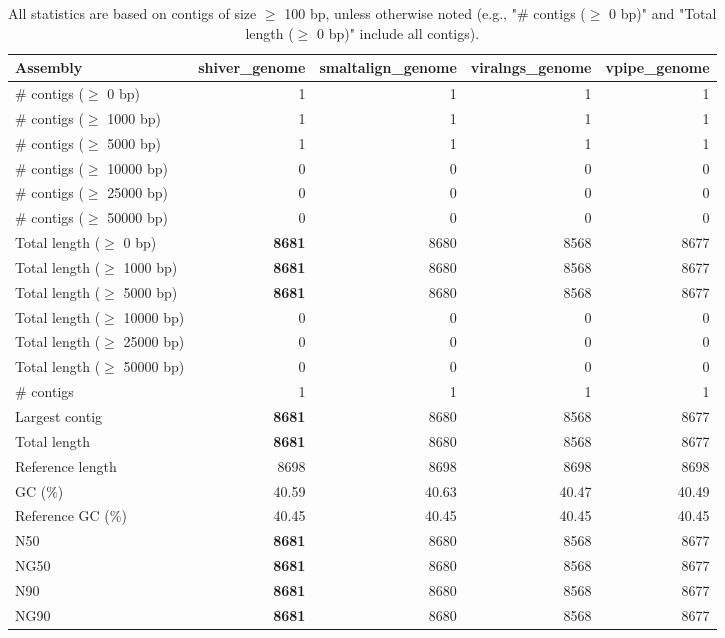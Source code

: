 \documentclass[12pt,a4paper]{article}
\begin{document}
\begin{table}[ht]
\begin{center}
\caption{All statistics are based on contigs of size $\geq$ 100 bp, unless otherwise noted (e.g., "\# contigs ($\geq$ 0 bp)" and "Total length ($\geq$ 0 bp)" include all contigs).}
\begin{tabular}{|l*{4}{|r}|}
\hline
Assembly & shiver\_genome & smaltalign\_genome & viralngs\_genome & vpipe\_genome \\ \hline
\# contigs ($\geq$ 0 bp) & 1 & 1 & 1 & 1 \\ \hline
\# contigs ($\geq$ 1000 bp) & 1 & 1 & 1 & 1 \\ \hline
\# contigs ($\geq$ 5000 bp) & 1 & 1 & 1 & 1 \\ \hline
\# contigs ($\geq$ 10000 bp) & 0 & 0 & 0 & 0 \\ \hline
\# contigs ($\geq$ 25000 bp) & 0 & 0 & 0 & 0 \\ \hline
\# contigs ($\geq$ 50000 bp) & 0 & 0 & 0 & 0 \\ \hline
Total length ($\geq$ 0 bp) & {\bf 8681} & 8680 & 8568 & 8677 \\ \hline
Total length ($\geq$ 1000 bp) & {\bf 8681} & 8680 & 8568 & 8677 \\ \hline
Total length ($\geq$ 5000 bp) & {\bf 8681} & 8680 & 8568 & 8677 \\ \hline
Total length ($\geq$ 10000 bp) & 0 & 0 & 0 & 0 \\ \hline
Total length ($\geq$ 25000 bp) & 0 & 0 & 0 & 0 \\ \hline
Total length ($\geq$ 50000 bp) & 0 & 0 & 0 & 0 \\ \hline
\# contigs & 1 & 1 & 1 & 1 \\ \hline
Largest contig & {\bf 8681} & 8680 & 8568 & 8677 \\ \hline
Total length & {\bf 8681} & 8680 & 8568 & 8677 \\ \hline
Reference length & 8698 & 8698 & 8698 & 8698 \\ \hline
GC (\%) & 40.59 & 40.63 & 40.47 & 40.49 \\ \hline
Reference GC (\%) & 40.45 & 40.45 & 40.45 & 40.45 \\ \hline
N50 & {\bf 8681} & 8680 & 8568 & 8677 \\ \hline
NG50 & {\bf 8681} & 8680 & 8568 & 8677 \\ \hline
N90 & {\bf 8681} & 8680 & 8568 & 8677 \\ \hline
NG90 & {\bf 8681} & 8680 & 8568 & 8677 \\ \hline

\end{tabular}
\end{center}
\end{table}
\end{document}
